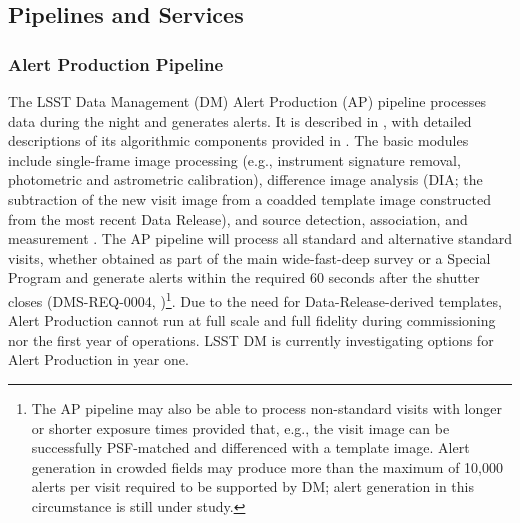 \subsection{Pipelines and Services}

\subsubsection{Alert Production Pipeline}\label{sec:AP}

The LSST Data Management (DM) Alert Production (AP) pipeline processes data during the night and generates alerts.
It is described in , with detailed descriptions of its algorithmic components provided in .
The basic modules include single-frame image processing (e.g., instrument signature removal, photometric and astrometric calibration), difference image analysis (DIA; the subtraction of the new visit image from a coadded template image constructed from the most recent Data Release), and source detection, association, and measurement .
The AP pipeline will process all standard and alternative standard visits, whether obtained as part of the main wide-fast-deep survey or a Special Program  and generate alerts within the required 60 seconds after the shutter closes (DMS-REQ-0004, )\footnote{
The AP pipeline may also be able to process non-standard visits with longer or shorter exposure times provided that, e.g., the visit image can be successfully PSF-matched and differenced with a template image.
Alert generation in crowded fields may produce more than the maximum of 10,000 alerts per visit required to be supported by DM; alert generation in this circumstance is still under study.
}.  
Due to the need for Data-Release-derived templates, Alert Production cannot run at full scale and full fidelity during commissioning nor the first year of operations.  LSST DM is currently investigating options for Alert Production in year one.

